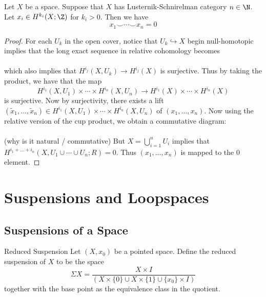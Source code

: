\documentclass[a4paper]{article}
\begin{document}
\begin{prp}{}{} Let $X$ be a space. Suppose that $X$ has Lusternik-Schnirelman category $n\in\N$. Let $x_i\in H^{k_i}(X;\Z)$ for $k_i>0$. Then we have $$x_1\smile\cdots\smile x_n=0$$ 
\begin{proof}
For each $U_k$ in the open cover, notice that $U_k\hookrightarrow X$ begin null-homotopic implies that the long exact sequence in relative cohomology becomes \\
\\
which also implies that $H^{i_j}(X,U_k)\to H^{i_j}(X)$ is surjective. Thus by taking the product, we have that the map $$H^{i_1}(X,U_1)\times\cdots\times H^{i_n}(X,U_n)\to H^{i_1}(X)\times\cdots\times H^{i_n}(X)$$ is surjective. Now by surjectivity, there exists a lift $(\tilde{x}_1,\dots,\tilde{x}_n)\in H^{i_1}(X,U_1)\times\cdots\times H^{i_n}(X,U_n)$ of $(x_1,\dots,x_n)$. Now using the relative version of the cup product, we obtain a commutative diagram: \\
\\
(why is it natural / commutative) But $X=\bigcup_{i=1}^nU_i$ implies that $H^{i_1+\dots+i_n}(X,U_1\cup\cdots\cup U_n;R)=0$. Thus $(x_1,\dots,x_n)$ is mapped to the $0$ element. 
\end{proof}
\end{prp}

\pagebreak
\section{Suspensions and Loopspaces}
\subsection{Suspensions of a Space}
\begin{defn}{Reduced Suspension}{} Let $(X,x_0)$ be a pointed space. Define the reduced suspension of $X$ to be the space $$\Sigma X=\frac{X\times I}{(X\times\{0\}\cup X\times\{1\}\cup\{x_0\}\times I)}$$ together with the base point as the equivalence class in the quotient. 
\end{defn}
\end{document}
